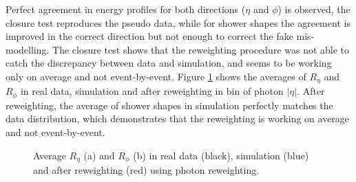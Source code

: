 Perfect agreement in energy profiles for both directions ($\eta$ and $\phi$) is observed, the closure test reproduces the pseudo data, while for shower shapes the agreement is improved in the correct direction but not enough to correct the fake mis-modelling. The closure test shows that the reweighting procedure was not able to catch the discrepancy between data and simulation, and seems to be working only on average and not event-by-event. Figure \ref{fig:gamma:ss:reweighting:photon:closure:avg} shows the averages of $R_{\eta}$ and $R_{\phi}$ in real data, simulation and after reweighting in bin of photon $|\eta|$. After reweighting, the average of shower shapes in simulation perfectly matches the data distribution, which demonstrates that the reweighting is working on average and not event-by-event.

\begin{figure}[H]
    \centering
    \caption{Average $R_{\eta}$ (a) and $R_{\phi}$ (b) in real data (black), simulation (blue) and after reweighting (red) using photon reweighting.}
    \label{fig:gamma:ss:reweighting:photon:closure:avg}
\end{figure}

\label{tab:avg}

